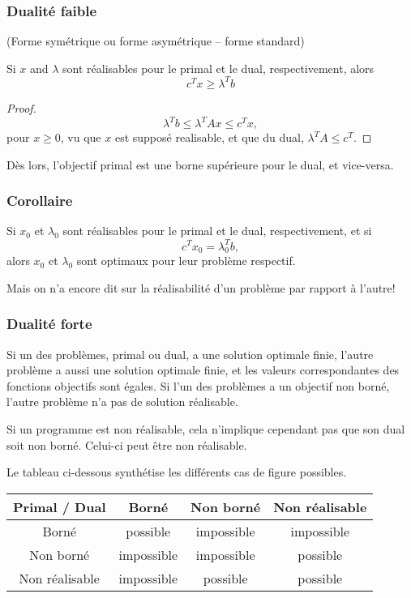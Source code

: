 \documentclass{beamer}
\begin{document}
\begin{frame}
	\frametitle{Dualité faible}
	
	(Forme symétrique ou forme asymétrique -- forme standard)
	
	\mbox{}
	
	Si $x$ and $\lambda$ sont réalisables pour le primal et le dual, respectivement, alors
	\[
	c^T x \geq \lambda^T b
	\]
	
	\begin{proof}
		\[
		\lambda^T b \leq \lambda^TAx \leq c^Tx,
		\]
		pour $x \geq 0$, vu que $x$ est supposé realisable, et que du dual, $\lambda^T A \leq c^T$.
	\end{proof}
	
	Dès lors, l'objectif primal est une borne supérieure pour le dual, et vice-versa.
	
\end{frame}

\begin{frame}
	\frametitle{Corollaire}
	
	Si $x_0$ et $\lambda_0$ sont réalisables pour le primal et le dual, respectivement, et si
	\[
	c^T x_0 = \lambda_0^T b,
	\]
	alors $x_0$ et $\lambda_0$ sont optimaux pour leur problème respectif.
	
	\mbox{}
	
	Mais on n'a encore dit sur la réalisabilité d'un problème par rapport à l'autre!
	
\end{frame}

\begin{frame}
	\frametitle{Dualité forte}
	
	Si un des problèmes, primal ou dual, a une solution optimale finie, l'autre problème a aussi une solution optimale finie, et les valeurs correspondantes des fonctions objectifs sont égales. Si l'un des problèmes a un objectif non borné, l'autre problème n'a pas de solution réalisable.

\mbox{}

Si un programme est non réalisable, cela n'implique cependant pas que son dual soit non borné. Celui-ci peut être non réalisable.

\mbox{}

Le tableau ci-dessous synthétise les différents cas de figure possibles.

\begin{center}
	\begin{tabular}{|c||c|c|c|}
		\hline
		Primal / Dual & Borné & Non borné & Non réalisable \\
		\hline
		\hline
		Borné & possible & impossible & impossible \\
		\hline
		Non borné & impossible & impossible & possible \\
		\hline
		Non réalisable & impossible & possible & possible \\
		\hline
	\end{tabular}
\end{center}

\end{frame}
\end{document}

